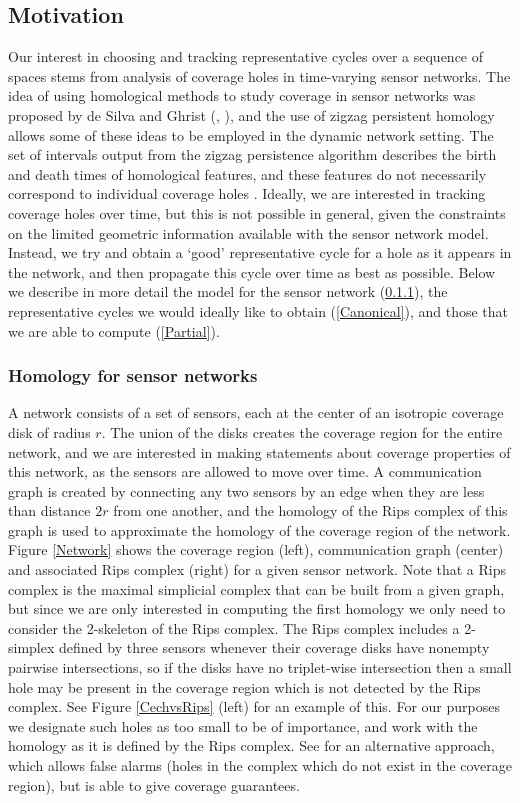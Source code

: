 \documentclass[12pt]{article}
\begin{document}
\subsection{Motivation}
Our interest in choosing and tracking representative cycles over a sequence of spaces stems from analysis of coverage holes in time-varying sensor networks. The idea of using homological methods to study coverage in sensor networks was proposed by de Silva and Ghrist (\cite{deSilva2006}, \cite{deSilva2007}), and the use of zigzag persistent homology allows some of these ideas to be employed in the dynamic network setting. The set of intervals output from the zigzag persistence algorithm describes the birth and death times of homological features, and these features do not necessarily correspond to individual coverage holes \cite{Adams2013}. Ideally, we are interested in tracking coverage holes over time, but this is not possible in general, given the constraints on the limited geometric information available with the sensor network model. Instead, we try and obtain a `good' representative cycle for a hole as it appears in the network, and then propagate this cycle over time as best as possible. Below we describe in more detail the model for the sensor network (\ref{Networks}), the representative cycles we would ideally like to obtain (\ref{Canonical}), and those that we are able to compute (\ref{Partial}).

\subsubsection{Homology for sensor networks}\label{Networks}

A network consists of a set of sensors, each at the center of an isotropic coverage disk of radius $r$. The union of the disks creates the coverage region for the entire network, and we are interested in making statements about coverage properties of this network, as the sensors are allowed to move over time. A communication graph is created by connecting any two sensors by an edge when they are less than distance $2r$ from one another, and the homology of the Rips complex of this graph is used to approximate the homology of the coverage region of the network. Figure \ref{Network} shows the coverage region (left), communication graph (center) and associated Rips complex (right) for a given sensor network. Note that a Rips complex is the maximal simplicial complex that can be built from a given graph, but since we are only interested in computing the first homology we only need to consider the 2-skeleton of the Rips complex. The Rips complex includes a 2-simplex defined by three sensors whenever their coverage disks have nonempty pairwise intersections, so if the disks have no triplet-wise intersection then a small hole may be present in the coverage region which is not detected by the Rips complex. See Figure \ref{CechvsRips} (left) for an example of this. For our purposes we designate such holes as too small to be of importance, and work with the homology as it is defined by the Rips complex. See \cite{deSilva2006} for an alternative approach, which allows false alarms (holes in the complex which do not exist in the coverage region), but is able to give coverage guarantees.
\end{document}
